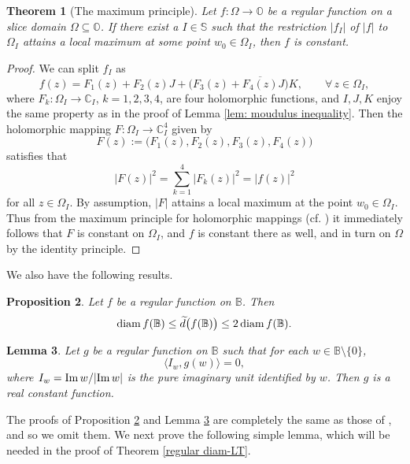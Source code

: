 \documentclass{amsart}
\newtheorem{theorem}{Theorem}[section]
\newtheorem{lemma}[theorem]{Lemma}
\newtheorem{proposition}[theorem]{Proposition}
\theoremstyle{definition}
\theoremstyle{remark}
\numberwithin{equation}{section}
\begin{document}
\begin{theorem}[The maximum principle]\label{MP}
Let $f:\Omega\rightarrow \mathbb O$ be a regular function on a slice domain $\Omega\subseteq\mathbb O$. If there exist a $I\in\mathbb S$ such that the restriction $|f_I|$  of $|f|$ to $\Omega_I$ attains a local maximum at some point $w_0\in \Omega_I$, then $f$ is constant.
\end{theorem}

\begin{proof}
 We can split $f_{I}$ as $$f(z)=F_1(z)+F_2(z)J+\big(F_3(z)+\overline{F_4(z)}J\big)K, \qquad \forall\, z\in\Omega_I,$$
where $F_k: \Omega_I\rightarrow \mathbb C_I$, $k=1,2,3,4$, are four holomorphic functions, and $I, J, K$ enjoy the same property as   in the proof of Lemma \ref{lem: moudulus inequality}. Then the holomorphic mapping $F:\Omega_{I}\rightarrow \mathbb C_{I}^4$ given by
$$F(z):=\big(F_1(z), F_2(z), F_3(z), F_4(z)\big)$$
 satisfies that
$$|F(z)|^2=\sum\limits_{k=1}^4|F_k(z)|^2=|f(z)|^2$$
for all $z\in\Omega_{I}$. By assumption, $|F|$ attains a local maximum at the point $w_0\in \Omega_{I}$. Thus from the maximum principle for holomorphic mappings (cf. \cite[Theorem 2.8.3]{Klimek}) it immediately follows that $F$ is constant on $\Omega_{I}$, and $f$ is constant there as well, and in turn on $\Omega$ by the identity principle.
\end{proof}

We also have the following results.

\begin{proposition}\label{regular-diameter-relation}
Let $f$ be a regular function on $\mathbb B$. Then
\begin{equation}\label{regular-diameter-relation01}
 {\rm{diam}}\, f(\mathbb B)\leq \widetilde{d}\big(f(\mathbb B)\big)\leq 2\,{\rm{diam}}\, f(\mathbb B).
\end{equation}
\end{proposition}

\begin{lemma}\label{Constant lemma}
Let  $g$ be a regular function on $\mathbb B$ such that for each $w\in\mathbb B\setminus\{0\}$,
$$\big\langle I_w, g(w)\big\rangle=0, $$
where $I_{w}={\rm{Im}}\,w/|{\rm{Im}}\,w|$ is the pure imaginary unit identified by $w$. Then $g$ is a real constant function.
\end{lemma}

The proofs of Proposition \ref{regular-diameter-relation}  and Lemma \ref{Constant lemma} are completely the same as those of \cite[Propositions 3.8 and 3.4]{Gen-Sar}, and so we omit them. We next prove the following simple lemma, which will be needed in the proof of Theorem \ref{regular diam-LT}.
\end{document}
